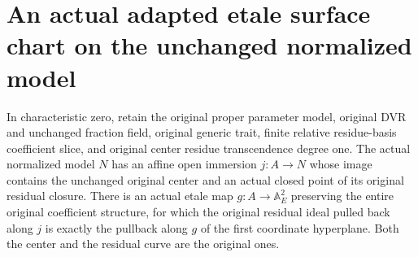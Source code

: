 \section{An actual adapted etale surface chart on the unchanged normalized model}
\begin{theorem}\label{thm:normalized-actual-adapted-etale-chart}
In characteristic zero, retain the original proper parameter model, original DVR and unchanged fraction field, original generic trait, finite relative residue-basis coefficient slice, and original center residue transcendence degree one. The actual normalized model $N$ has an affine open immersion $j:A\to N$ whose image contains the unchanged original center and an actual closed point of its original residual closure. There is an actual etale map $g:A\to\mathbb A_E^2$ preserving the entire original coefficient structure, for which the original residual ideal pulled back along $j$ is exactly the pullback along $g$ of the first coordinate hyperplane. Both the center and the residual curve are the original ones.
\leanok
\end{theorem}
